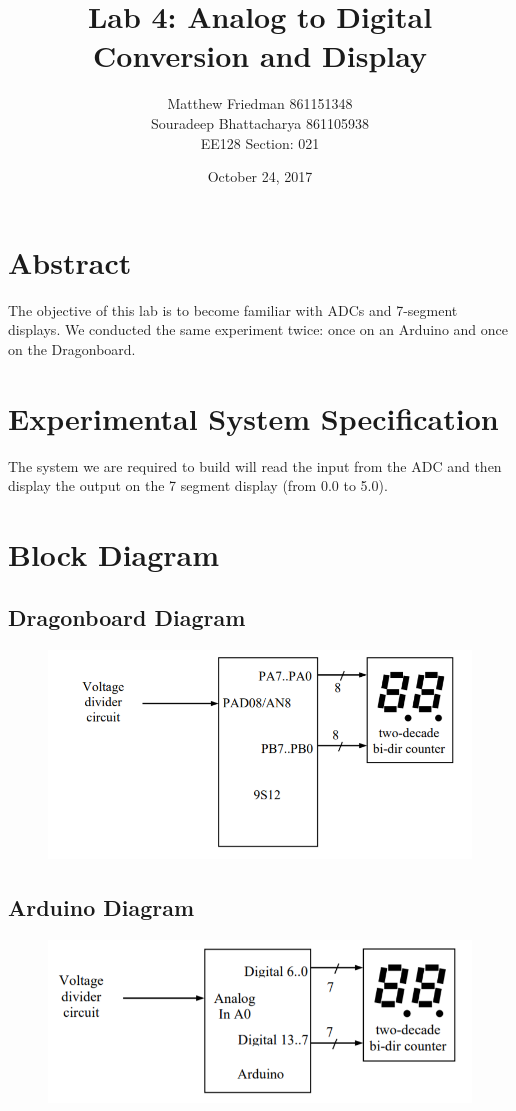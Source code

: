 \documentclass{article}
\title{Lab 4: Analog to Digital Conversion and Display}
\date{October 24, 2017}
\author{Matthew Friedman 861151348\\Souradeep Bhattacharya 861105938\\EE128 Section: 021}
\begin{document}
	\maketitle
	\section*{Abstract}
	The objective of this lab is to become familiar with ADCs and 7-segment displays. We conducted the same experiment twice: once on an Arduino and once on the Dragonboard.
	\section*{Experimental System Specification}
	The system we are required to build will read the input from the ADC and then display the output on the 7 segment display (from 0.0 to 5.0).
	\section*{Block Diagram}
	\subsection*{Dragonboard Diagram}
		\begin{figure}[H]
		\centering
		\includegraphics[width=1\textwidth]{Dragon_Block_Diagram}
	\end{figure}
	
	\subsection*{Arduino Diagram}
		\begin{figure}[H]
		\centering
		\includegraphics[width=1\textwidth]{Arduino_Block_Diagram}
	\end{figure}
	
\end{document}
